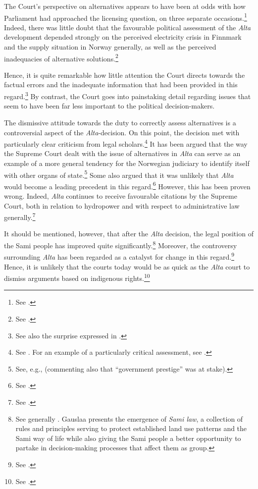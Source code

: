 The Court's perspective on alternatives appears to have been at odds with how Parliament had approached the licensing question, on three separate occasions.\footnote{See \cite[342]{alta82}.} Indeed, there was little doubt that the favourable political assessment of the {\it Alta} development depended strongly on the perceived electricity crisis in Finnmark and the supply situation in Norway generally, as well as the perceived inadequacies of alternative solutions.\footnote{See \cite[338-347]{alta82}.}

Hence, it is quite remarkable how little attention the Court directs towards the factual errors and the inadequate information that had been provided in this regard.\footnote{See also the surprise expressed in \cite[349-351]{eckhoff82}.} By contrast, the Court goes into painstaking detail regarding issues that seem to have been far less important to the political decision-makers.

The dismissive attitude towards the duty to correctly assess alternatives is a controversial aspect of the {\it Alta}-decision. On this point, the decision met with particularly clear criticism from legal scholars.\footnote{See \cite[311]{haagensen02}. For an example of a particularly critical assessment, see \cite[580-584]{backer86}.} It has been argued that the way the Supreme Court dealt with the issue of alternatives in {\it Alta} can serve as an example of a more general tendency for the Norwegian judiciary to identify itself with other organs of state.\footnote{See, e.g., \cite[64]{graver88} (commenting also that ``government prestige'' was at stake).} Some also argued that it was unlikely that {\it Alta} would become a leading precedent in this regard.\footnote{See \cite[580-584]{backer86}.} However, this has been proven wrong. Indeed, {\it Alta} continues to receive favourable citations by the Supreme Court, both in relation to hydropower and with respect to administrative law generally.\footnote{See \cite{ambassade09,jorpeland11}.}

It should be mentioned, however, that after the {\it Alta} decision, the legal position of the Sami people has improved quite significantly.\footnote{See generally \cite{gauslaa07}. Gauslaa presents the emergence of {\it Sami law}, a collection of rules and principles serving to protect established land use patterns and the Sami way of life while also giving the Sami people a better opportunity to partake in decision-making processes that affect them as group.} Moreover, the controversy surrounding {\it Alta} has been regarded as a catalyst for change in this regard.\footnote{See \cite[156]{ravna12s}.} Hence, it is unlikely that the courts today would be as quick as the {\it Alta} court to dismiss arguments based on indigenous rights.\footnote{See \cite[180]{gauslaa07}.}

